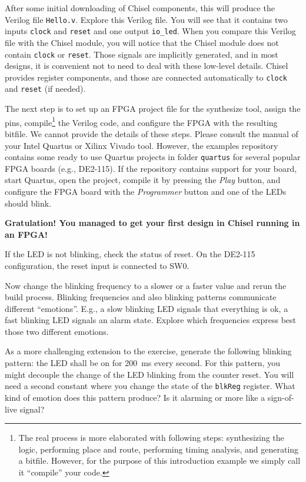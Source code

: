 \documentclass[%
    10pt,
    headinclude, footexclude,
    openright, %
    notitlepage,
    cleardoubleempty,
    headsepline,
    pointlessnumbers,
    bibtotoc, idxtotoc,
    ]{scrbook}
\newcommand{\code}[1]{{\small{\texttt{#1}}}}
\begin{document}
After some initial downloading of Chisel components, this will produce the Verilog file \code{Hello.v}.
Explore this Verilog file. You will see that it contains two inputs \code{clock} and \code{reset}
and one output \code{io\_led}. When you compare this Verilog file with the Chisel module,
you will notice that the Chisel module does not contain \code{clock} or \code{reset}.
Those signals are implicitly generated, and in most designs, it is convenient not to need to
deal with these low-level details. Chisel provides register components, and those
are connected automatically to \code{clock} and \code{reset} (if needed).

The next step is to set up an FPGA project file for the synthesize tool, assign the pins,
compile\footnote{The real process is more elaborated with following steps: synthesizing the logic,
performing place and route, performing timing analysis, and generating a bitfile.
However, for the purpose of this introduction example we simply call it ``compile''
your code.} the Verilog code, and configure the FPGA with the resulting bitfile.
We cannot provide the details of these steps. Please consult the manual of
your Intel Quartus or Xilinx Vivado tool.
However, the examples repository contains some ready to use Quartus
projects in folder \code{quartus} for several popular FPGA boards (e.g., DE2-115).
If the repository contains support for your board, start Quartus, open the project,
compile it by pressing the \emph{Play} button, and configure the FPGA board
with the \emph{Programmer} button and one of the LEDs should blink.

{\bf Gratulation! You managed to get your first design in Chisel running in an FPGA!}

If the LED is not blinking, check the status of reset. On the DE2-115 configuration,
the reset input is connected to SW0.

Now change the blinking frequency to a slower or a faster value and
rerun the build process. Blinking frequencies and also blinking patterns
communicate different ``emotions''. E.g., a slow blinking LED signals that
everything is ok, a fast blinking LED signals an alarm state.
Explore which frequencies express best those two different emotions.

As a more challenging extension to the exercise, generate the following blinking pattern:
the LED shall be on for 200~ms every second. For this pattern, you might
decouple the change of the LED blinking from the counter reset.
You will need a second constant where you change the state of the
\code{blkReg} register. What kind of emotion does this pattern produce?
Is it alarming or more like a sign-of-live signal?
\end{document}
